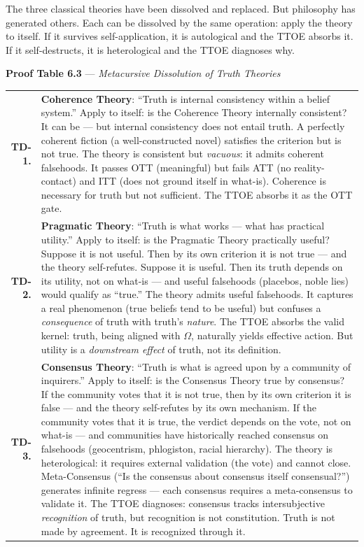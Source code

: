 \documentclass[10pt, openany, oneside]{book}
\renewcommand{\footnotesize}{\fontsize{8.5}{11}\selectfont}
\begin{document}
\vspace{1em}

\noindent The three classical theories have been dissolved and replaced. But philosophy has generated others. Each can be dissolved by the same operation: apply the theory to itself. If it survives self-application, it is autological and the TTOE absorbs it. If it self-destructs, it is heterological and the TTOE diagnoses why.

\textbf{Proof Table 6.3} --- \textit{Metacursive Dissolution of Truth Theories}

\vspace{0.5em}

{\footnotesize
\noindent\begin{tabular}{r p{}}
\textbf{TD-1.} & \textbf{Coherence Theory}: ``Truth is internal consistency within a belief system.'' Apply to itself: is the Coherence Theory internally consistent? It can be --- but internal consistency does not entail truth. A perfectly coherent fiction (a well-constructed novel) satisfies the criterion but is not true. The theory is consistent but \textit{vacuous}: it admits coherent falsehoods. It passes OTT (meaningful) but fails ATT (no reality-contact) and ITT (does not ground itself in what-is). Coherence is necessary for truth but not sufficient. The TTOE absorbs it as the OTT gate. \\[0.5em]
\textbf{TD-2.} & \textbf{Pragmatic Theory}: ``Truth is what works --- what has practical utility.'' Apply to itself: is the Pragmatic Theory practically useful? Suppose it is not useful. Then by its own criterion it is not true --- and the theory self-refutes. Suppose it is useful. Then its truth depends on its utility, not on what-is --- and useful falsehoods (placebos, noble lies) would qualify as ``true.'' The theory admits useful falsehoods. It captures a real phenomenon (true beliefs tend to be useful) but confuses a \textit{consequence} of truth with truth's \textit{nature}. The TTOE absorbs the valid kernel: truth, being aligned with $\Omega$, naturally yields effective action. But utility is a \textit{downstream effect} of truth, not its definition. \\[0.5em]
\textbf{TD-3.} & \textbf{Consensus Theory}: ``Truth is what is agreed upon by a community of inquirers.'' Apply to itself: is the Consensus Theory true by consensus? If the community votes that it is not true, then by its own criterion it is false --- and the theory self-refutes by its own mechanism. If the community votes that it is true, the verdict depends on the vote, not on what-is --- and communities have historically reached consensus on falsehoods (geocentrism, phlogiston, racial hierarchy). The theory is heterological: it requires external validation (the vote) and cannot close. Meta-Consensus (``Is the consensus about consensus itself consensual?'') generates infinite regress --- each consensus requires a meta-consensus to validate it. The TTOE diagnoses: consensus tracks intersubjective \textit{recognition} of truth, but recognition is not constitution. Truth is not made by agreement. It is recognized through it. \\[0.3em]
\end{tabular}
}
\end{document}
